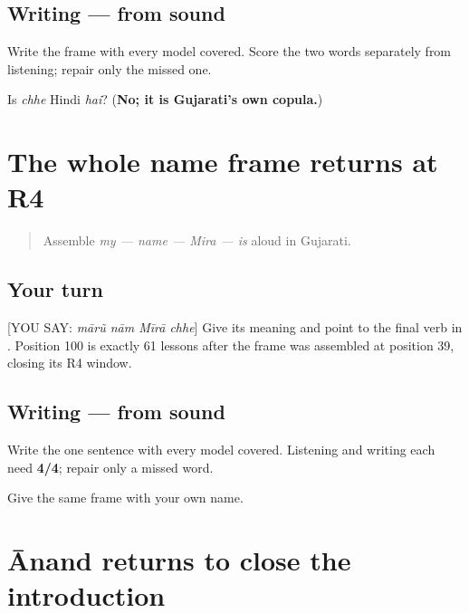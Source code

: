 \subsection*{Writing — from sound}
Write the frame with every model covered. Score the two words separately from listening; repair only the missed one.

\begin{tcolorbox}[breakable,colback=teal!4,colframe=teal!35!black,title={Before you move on}]
Is \emph{chhe} Hindi \emph{hai}? (\textbf{No; it is Gujarati's own copula.})
\end{tcolorbox}
\section[Practice]{The whole name frame returns at R4}

\label{lesson:GU-R16-my-name-is-r4}



\begin{quote}
Assemble \emph{my — name — Mira — is} aloud in Gujarati.
\end{quote}

\subsection*{Your turn}
{[}YOU SAY: \emph{mārũ nām Mīrā chhe}{]} Give its meaning and point to the final verb in \textbf{   }. Position 100 is exactly 61 lessons after the frame was assembled at position 39, closing its R4 window.

\subsection*{Writing — from sound}
Write the one sentence with every model covered. Listening and writing each need \textbf{4/4}; repair only a missed word.

\begin{tcolorbox}[breakable,colback=teal!4,colframe=teal!35!black,title={Before you move on}]
Give the same frame with your own name.
\end{tcolorbox}
\section[Practice]{Ānand returns to close the introduction}

\label{lesson:GU-R16-anand-r4}



